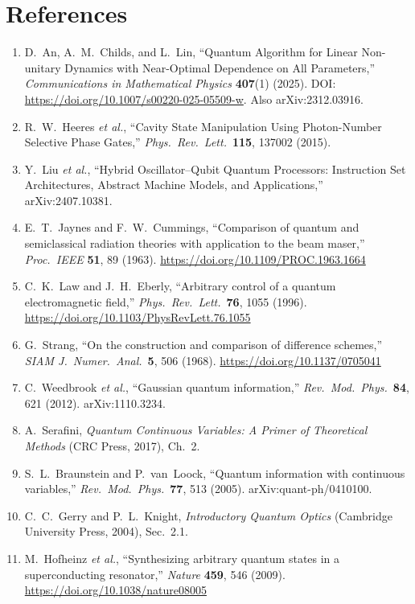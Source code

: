 \documentclass[11pt]{article}
\begin{document}
\section*{References}
\begin{enumerate}
\item D.~An, A.~M.~Childs, and L.~Lin, ``Quantum Algorithm for Linear Non-unitary Dynamics with Near-Optimal Dependence on All Parameters,''
\emph{Communications in Mathematical Physics} \textbf{407}(1) (2025). DOI: \url{https://doi.org/10.1007/s00220-025-05509-w}. Also arXiv:2312.03916.
\item R.~W.~Heeres \emph{et al.}, ``Cavity State Manipulation Using Photon-Number Selective Phase Gates,'' \emph{Phys.\ Rev.\ Lett.}\ \textbf{115}, 137002 (2015).
\item Y.~Liu \emph{et al.}, ``Hybrid Oscillator--Qubit Quantum Processors: Instruction Set Architectures, Abstract Machine Models, and Applications,'' arXiv:2407.10381.
\item E.~T.~Jaynes and F.~W.~Cummings, ``Comparison of quantum and semiclassical radiation theories with application to the beam maser,'' \emph{Proc.\ IEEE} \textbf{51}, 89 (1963). \url{https://doi.org/10.1109/PROC.1963.1664}
\item C.~K.~Law and J.~H.~Eberly, ``Arbitrary control of a quantum electromagnetic field,'' \emph{Phys.\ Rev.\ Lett.}\ \textbf{76}, 1055 (1996). \url{https://doi.org/10.1103/PhysRevLett.76.1055}
\item G.~Strang, ``On the construction and comparison of difference schemes,'' \emph{SIAM J.\ Numer.\ Anal.}\ \textbf{5}, 506 (1968). \url{https://doi.org/10.1137/0705041}
\item C.~Weedbrook \emph{et al.}, ``Gaussian quantum information,'' \emph{Rev.\ Mod.\ Phys.}\ \textbf{84}, 621 (2012). arXiv:1110.3234.
\item A.~Serafini, \emph{Quantum Continuous Variables: A Primer of Theoretical Methods} (CRC Press, 2017), Ch.~2.
\item S.~L.~Braunstein and P.~van~Loock, ``Quantum information with continuous variables,'' \emph{Rev.\ Mod.\ Phys.}\ \textbf{77}, 513 (2005). arXiv:quant-ph/0410100.
\item C.~C.~Gerry and P.~L.~Knight, \emph{Introductory Quantum Optics} (Cambridge University Press, 2004), Sec.~2.1.
\item M.~Hofheinz \emph{et al.}, ``Synthesizing arbitrary quantum states in a superconducting resonator,'' \emph{Nature} \textbf{459}, 546 (2009). \url{https://doi.org/10.1038/nature08005}

\end{enumerate}
\end{document}

